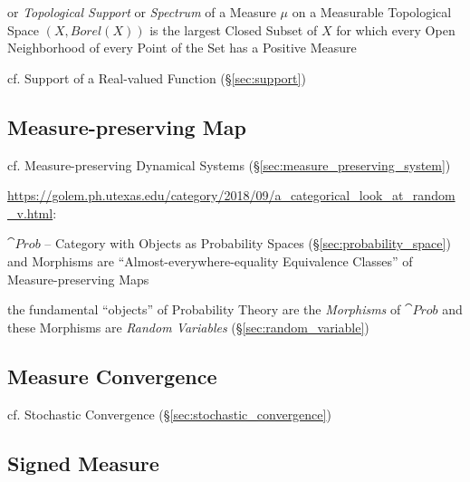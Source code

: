 or \emph{Topological Support} or \emph{Spectrum} of a Measure $\mu$ on a
Measurable Topological Space $(\xspace{X}, Borel(\xspace{X}))$ is the largest
Closed Subset of $\xspace{X}$ for which every Open Neighborhood of every Point
of the Set has a Positive Measure

cf. Support of a Real-valued Function (\S\ref{sec:support})



\subsection{Measure-preserving Map}\label{sec:measure_preserving_map}

cf. Measure-preserving Dynamical Systems (\S\ref{sec:measure_preserving_system})

\url{https://golem.ph.utexas.edu/category/2018/09/a_categorical_look_at_random_v.html}:

$\cat{Prob}$ -- Category with Objects as Probability Spaces
(\S\ref{sec:probability_space}) and Morphisms are ``Almost-everywhere-equality
Equivalence Classes'' of Measure-preserving Maps

the fundamental ``objects'' of Probability Theory are the \emph{Morphisms} of
$\cat{Prob}$ and these Morphisms are \emph{Random Variables}
(\S\ref{sec:random_variable})



\subsection{Measure Convergence}\label{sec:measure_convergence}

cf. Stochastic Convergence (\S\ref{sec:stochastic_convergence})



\subsection{Signed Measure}\label{sec:signed_measure}

